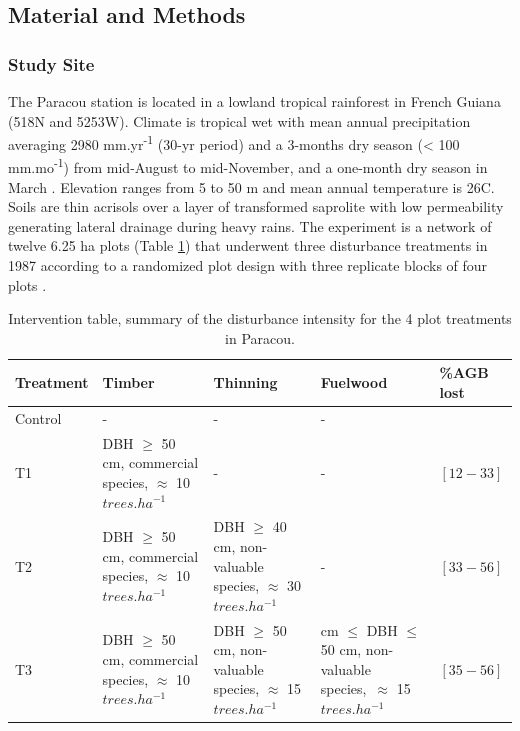 \documentclass[
  11pt,
  french,
  A4paper,
  extrafontsizes,onecolumn,openright
  ]{memoir}
\begin{document}
\subsection{Material and Methods}\label{material-and-methods-1}

\subsubsection{Study Site}\label{study-site-1}

The Paracou station is located in a lowland tropical rainforest in
French Guiana (518\textdegree N and 5253\textdegree W). Climate is
tropical wet with mean annual precipitation averaging 2980
mm.yr\textsuperscript{-1} (30-yr period) and a 3-months dry season
(\textless{} 100 mm.mo\textsuperscript{-1}) from mid-August to
mid-November, and a one-month dry season in March \autocite{Wagner2011}.
Elevation ranges from 5 to 50 m and mean annual temperature is
26\textdegree C. Soils are thin acrisols over a layer of transformed
saprolite with low permeability generating lateral drainage during heavy
rains. The experiment is a network of twelve 6.25 ha plots (Table
\ref{tab:Tab1bis}) that underwent three disturbance treatments in 1987
according to a randomized plot design with three replicate blocks of
four plots \autocite{Herault2018}.

\begingroup\fontsize{7}{9}\selectfont

\begin{longtable}[t]{>{\raggedright\arraybackslash}p{5em}|>{\raggedright\arraybackslash}p{8em}|>{\raggedright\arraybackslash}p{8em}|>{\raggedright\arraybackslash}p{11em}|>{\raggedright\arraybackslash}p{4em}}
\caption{\label{tab:Tab1bis}Intervention table, summary of the disturbance intensity for the 4 plot treatments in Paracou.}\\
\hline
Treatment & Timber & Thinning & Fuelwood & \%AGB lost\\
\hline
Control & - & - & - & 0\\
\hline
T1 & DBH $\geq$ 50 cm, commercial species, $\approx$ 10   $trees.ha^{-1}$ & - & - & $[12-33]$\\
\hline
T2 & DBH $\geq$ 50 cm, commercial species, $\approx$ 10  $trees.ha^{-1}$ & DBH $\geq$ 40 cm, non-valuable species, $\approx$ 30   $trees.ha^{-1}$ & - & $[33-56]$\\
\hline
T3 & DBH $\geq$ 50 cm, commercial species, $\approx$ 10  $trees.ha^{-1}$ & DBH $\geq$ 50 cm, non-valuable species, $\approx$ 15  $trees.ha^{-1}$ & 40 cm $\leq$ DBH $\leq$ 50 cm, non-valuable species,\ $\approx$ 15 $trees.ha^{-1}$ & $[35-56]$\\
\hline
\end{longtable}
\end{document}
